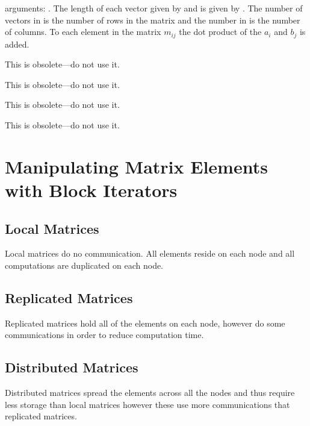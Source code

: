 \begin{description}
arguments: \linebreak {}.  The length of each vector given by
 and  is given by .  The number of vectors in
 is the number of rows in the matrix and the number in  is
the number of columns.  To each element in the matrix $m_{ij}$ the dot
product of the $a_i$ and $b_j$ is added.
\item[\clsnm{SCElementAccumulateSCMatrix}]  This is obsolete---do not use it.
\item[\clsnm{SCElementAccumulateSymmSCMatrix}] This is obsolete---do not
use it.
\item[\clsnm{SCElementAccumulateDiagSCMatrix}] This is obsolete---do not
use it.
\item[\clsnm{SCElementAccumulateSCVector}] This is obsolete---do not use
it.
\end{description}

\section{Manipulating Matrix Elements with Block Iterators}



\subsection{Local Matrices}

Local matrices do no communication.  All elements reside on each node
and all computations are duplicated on each node.

\subsection{Replicated Matrices}

Replicated matrices hold all of the elements on each node, however
do some communications in order to reduce computation time.

\subsection{Distributed Matrices}

Distributed matrices spread the elements across all the nodes and
thus require less storage than local matrices however these use
more communications that replicated matrices.

